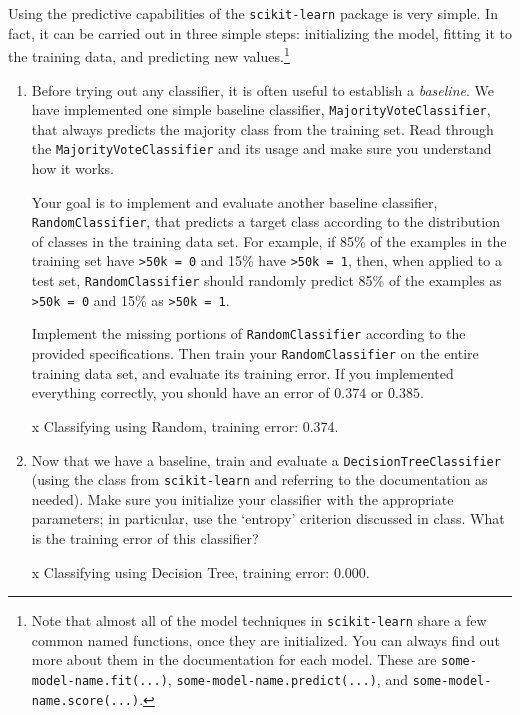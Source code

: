 Using the predictive capabilities of the \verb|scikit-learn| package is very simple. In fact, it can be carried out in three simple steps: initializing the model, fitting it to the training data, and predicting new values.\footnote{Note that almost all of the model techniques in \verb|scikit-learn| share a few common named functions, once they are initialized. You can always find out more about them in the documentation for each model. These are \verb|some-model-name.fit(...)|, \verb|some-model-name.predict(...)|, and \verb|some-model-name.score(...)|.}


\begin{enumerate}[resume]

\item {} Before trying out any classifier, it is often useful to establish a \emph{baseline}. We have implemented one simple baseline classifier, \verb|MajorityVoteClassifier|, that always predicts the majority class from the training set. Read through the \verb|MajorityVoteClassifier| and its usage and make sure you understand how it works.

Your goal is to implement and evaluate another baseline classifier, \verb|RandomClassifier|, that predicts a target class according to the distribution of classes in the training data set. For example, if 85\% of the examples in the training set have \verb|>50k = 0| and 15\% have \verb|>50k = 1|, then, when applied to a test set, \verb|RandomClassifier| should randomly predict 85\% of the examples as \verb|>50k = 0| and 15\% as \verb|>50k = 1|.

Implement the missing portions of \verb|RandomClassifier| according to the provided specifications. Then train your \verb|RandomClassifier| on the entire training data set, and evaluate its training error. If you implemented everything correctly, you should have an error of {\color {red} {$0.374$} } or {\color {red} {$0.385$.} }

\sol x Classifying using Random, training error: 0.374.

\item {} Now that we have a baseline, train and evaluate a \verb|DecisionTreeClassifier| (using the class from \verb|scikit-learn| and referring to the documentation as needed). Make sure you initialize your classifier with the appropriate parameters; in particular, use the `entropy' criterion discussed in class. What is the training error of this classifier?

\sol x Classifying using Decision Tree, training error: 0.000.


\end{enumerate}
